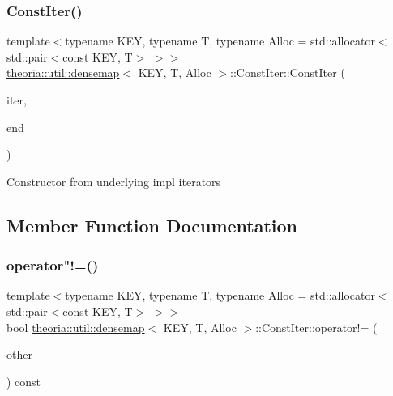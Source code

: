\subsubsection{\texorpdfstring{Const\+Iter()}{ConstIter()}\hspace{0.1cm}{\footnotesize\ttfamily [3/3]}}
{\footnotesize\ttfamily template$<$typename K\+EY, typename T, typename Alloc = std\+::allocator$<$std\+::pair$<$const K\+E\+Y, T$>$ $>$$>$ \\
\hyperlink{classtheoria_1_1util_1_1densemap}{theoria\+::util\+::densemap}$<$ K\+EY, T, Alloc $>$\+::Const\+Iter\+::\+Const\+Iter (\begin{DoxyParamCaption}\item[{typename Impl\+::const\+\_\+iterator}]{iter,  }\item[{typename Impl\+::const\+\_\+iterator}]{end }\end{DoxyParamCaption})\hspace{0.3cm}{\ttfamily [inline]}}

Constructor from underlying impl iterators 

\subsection{Member Function Documentation}
\mbox{\label{classtheoria_1_1util_1_1densemap_1_1ConstIter_a4ce33ebd18a5c6e3aca5efb4e3f83d81}} 
\subsubsection{\texorpdfstring{operator"!=()}{operator!=()}}
{\footnotesize\ttfamily template$<$typename K\+EY, typename T, typename Alloc = std\+::allocator$<$std\+::pair$<$const K\+E\+Y, T$>$ $>$$>$ \\
bool \hyperlink{classtheoria_1_1util_1_1densemap}{theoria\+::util\+::densemap}$<$ K\+EY, T, Alloc $>$\+::Const\+Iter\+::operator!= (\begin{DoxyParamCaption}\item[{const \hyperlink{classtheoria_1_1util_1_1densemap_1_1ConstIter}{Const\+Iter} \&}]{other }\end{DoxyParamCaption}) const\hspace{0.3cm}{\ttfamily [inline]}}

